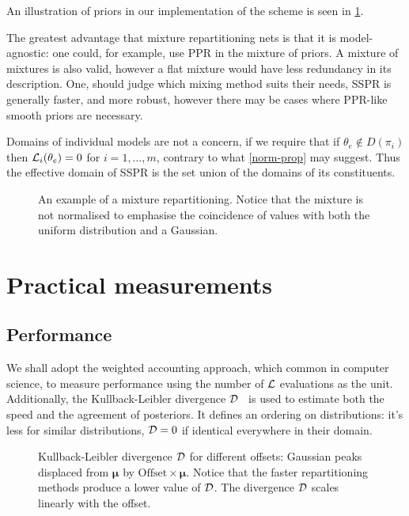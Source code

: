 \documentclass[usenatbib]{mnras}
\begin{document}
An illustration of priors in our implementation of the scheme is seen
in \cref{fig:mixture}.

The greatest advantage that mixture repartitioning nets is that it is
model-agnostic: one could, for example, use PPR in the mixture of
priors. A mixture of mixtures is also valid, however a flat mixture
would have less redundancy in its description.  One, should judge
which mixing method suits their needs, SSPR is generally faster, and
more robust, however there may be cases where PPR-like smooth priors
are necessary.


Domains of individual models are not a concern, if we require that if
$\theta_{e} \not\in D(\pi_{i})$ then ${\cal L}_{i}(\theta_{e})=0$ for
$i=1,\ldots,m$, contrary to what \cref{norm-prop} may suggest. Thus
the effective domain of SSPR is the set union of the domains of its
constituents.

\begin{figure}
 
\caption{An example of a mixture repartitioning. Notice that the mixture is not normalised to emphasise the coincidence of values with both the uniform distribution and a Gaussian.\label{fig:mixture}}
\end{figure}



\section{Practical measurements}
\subsection{Performance}
We shall adopt the weighted accounting approach, which common in
computer science, to measure performance using the number of
\({\cal L}\) evaluations as the unit. Additionally, the
Kullback-Leibler divergence \({\cal D}\)~\cite[see]{Kullback_1951} is
used to estimate both the speed and the agreement of posteriors. It
defines an ordering on distributions: it's less for similar
distributions, ${\cal D}=0$ if identical everywhere in their domain.

\begin{figure}
  
\caption{Kullback-Leibler divergence \({\cal D}\) for different offsets: Gaussian peaks displaced from \(\bm{\mu}\) by \(\text{Offset}\times \bm{\mu}\). Notice that the faster repartitioning methods produce a lower value of \({\cal D}\). The divergence \({\cal D}\) scales linearly with the offset.\label{fig:kl-d}}
\end{figure}
\end{document}
